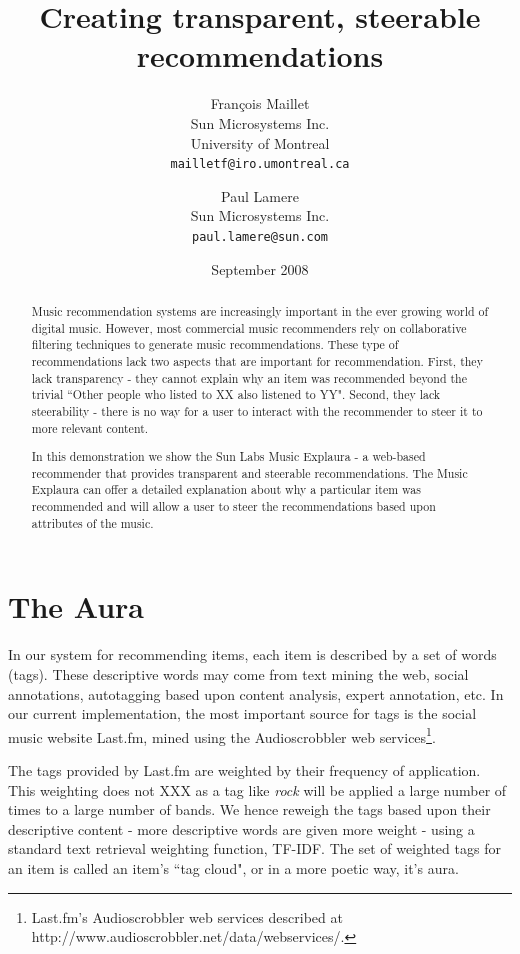 \documentclass[a4paper,10pt,twocolumn]{article}
\title{Creating transparent, steerable recommendations}
\author{
Fran\c{c}ois Maillet\\
Sun Microsystems Inc.\\
University of Montreal\\
\texttt{mailletf@iro.umontreal.ca}
\and 
Paul Lamere \\
Sun Microsystems Inc.\\
\texttt{paul.lamere@sun.com}
}
\date{September 2008}
\begin{document}
\maketitle

\begin{abstract}

Music recommendation systems are increasingly important in the ever 
    growing world of digital music.  However, most commercial music 
    recommenders rely on collaborative filtering techniques to generate 
    music recommendations. These type of recommendations lack two aspects 
    that are important for recommendation.  First, they lack transparency 
    - they cannot explain why an item was recommended beyond the trivial 
    ``Other people who listed to XX also listened to YY". Second, they 
    lack steerability - there is no way for a user to interact with the 
    recommender to steer it to more relevant content.
    
    In this demonstration we show the Sun Labs Music Explaura - a 
    web-based recommender that provides transparent and steerable 
    recommendations. The Music Explaura can offer a detailed explanation 
    about why a particular item was recommended and will allow a user to 
    steer the recommendations based upon attributes of the music.

\end{abstract}

\section{The Aura}

In our system for recommending items, each item is
described by a set of words (tags).  These
descriptive words may come from text mining the
web, social annotations, autotagging based upon
content analysis, expert annotation, etc. In our current 
implementation, the most important source for tags 
is the social music website Last.fm, mined using the
Audioscrobbler web services\footnote{Last.fm's Audioscrobbler web services described at http://www.audioscrobbler.net/data/webservices/.}.

The tags provided by Last.fm are weighted by their frequency 
of application. This weighting does not  XXX as a tag like \textit{rock} 
will be applied a large number of times to a large number of bands. 
We hence reweigh the tags based upon their descriptive
content - more descriptive words are given more
weight - using a standard text retrieval weighting function,
TF-IDF. The set of weighted tags for an item is called an
item's ``tag cloud", or in a more poetic way, it's aura.
\end{document}

